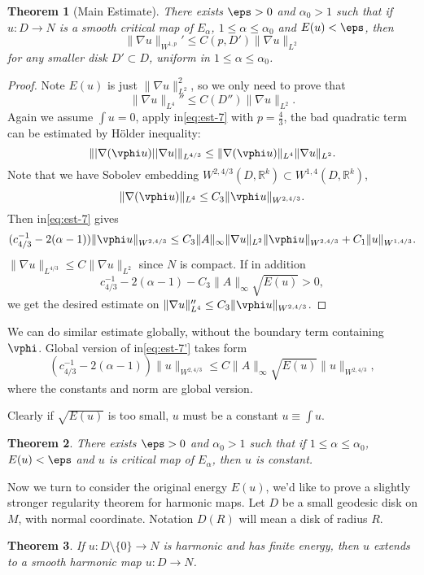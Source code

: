 \documentclass[UTF8,12pt]{article}
\theoremstyle{plain}\newtheorem{theorem}{Theorem}
\theoremstyle{definition}\newtheorem{definition}[theorem]{Definition}
\theoremstyle{definition}\newtheorem{example}[theorem]{Example}
\theoremstyle{plain}\newtheorem{axiom}[theorem]{Axiom}
\theoremstyle{plain}\newtheorem{assertion}[theorem]{Assertion}
\theoremstyle{plain}\newtheorem{corollary}[theorem]{Corollary}
\theoremstyle{plain}\newtheorem{lemma}[theorem]{Lemma}
\theoremstyle{plain}\newtheorem{proposition}[theorem]{Proposition}
\theoremstyle{plain}\newtheorem{prop}[theorem]{Proposition}
\theoremstyle{plain}\newtheorem{conjecture}[theorem]{Conjecture}
\theoremstyle{plain}\newtheorem{conj}[theorem]{Conjecture}
\theoremstyle{plain}\newtheorem{problem}[theorem]{Problem}
\theoremstyle{remark}\newtheorem{notation}[theorem]{Notation}
\theoremstyle{definition}\newtheorem*{question}{Question}
\theoremstyle{definition}\newtheorem*{answer}{Answer}
\theoremstyle{definition}\newtheorem*{goal}{Goal}
\theoremstyle{plain}\newtheorem*{application}{Application}
\theoremstyle{plain}\newtheorem*{exercise}{Exercise}
\theoremstyle{remark}\newtheorem*{remark}{Remark}
\theoremstyle{remark}\newtheorem*{note}{\small{Note}}
\numberwithin{equation}{section}
\numberwithin{theorem}{section}
\numberwithin{figure}{section}
\begin{document}
\begin{theorem}[Main Estimate]\label{thm:main-est}
    There exists \(\eps>0\) and \(\alpha_0>1\) such that if \(u\colon D\to N\)
    is a {\color{red}smooth} critical map of \(E_\alpha\), \(1\le\alpha\le\alpha_0\) and \(E(u)<\eps\), then \[
        \|\nabla u\|_{W^{1,p}}'\le C(p,D')\|\nabla u\|_{L^2}
    \] for any smaller disk \(D'\subset D\), uniform in \(1\le \alpha\le\alpha_0\).
\end{theorem}
\begin{proof}
    Note \(E(u)\) is just \(\|\nabla u\|_{L^2}^2\), so we only need to prove that \[
        \|\nabla u\|_{L^4}''\le C(D'')\|\nabla u\|_{L^2}
    .\] Again we assume \(\int u=0\), apply in\cref{eq:est-7} with \(p=\frac{4}{3}\),
    the bad quadratic term can be estimated by H\"older inequality: \[
        \||\nabla(\vphi u)||\nabla u|\|_{L^{4/3}}
        \le \|\nabla(\vphi u)\|_{L^4}\|\nabla u\|_{L^2}
    .\] Note that we have Sobolev embedding \(W^{2,4/3}(D,\mathbb{R}^k)
    \subset W^{1,4}(D,\mathbb{R}^k)\), \ie\ \[
        \|\nabla(\vphi u)\|_{L^4}\le C_3\|\vphi u\|_{W^{2,4/3}}
    .\] Then in\cref{eq:est-7} gives
    \begin{equation}\label{eq:est-7'}
    (c_{4/3}^{-1}-2(\alpha-1))\|\vphi u\|_{W^{2,4/3}}
    \le C_3\|A\|_{\infty}\|\nabla u\|_{L^2}\|\vphi u\|_{W^{2,4/3}}
    +C_1\|u\|_{W^{1,4/3}}
    .\end{equation}
    \(\|\nabla u\|_{L^{4/3}}\le C\|\nabla u\|_{L^2}\) since \(N\) is
    compact. If in addition \[
        c_{4/3}^{-1}-2(\alpha-1)-C_3\|A\|_{\infty}\sqrt{E(u)}>0
    ,\] we get the desired estimate on \(\|\nabla u\|_{L^4}''\le C_3\|\vphi u\|
    _{W^{2,4/3}}\).
\end{proof}
We can do similar estimate globally, without the boundary term containing \(\vphi\).
Global version of in\cref{eq:est-7'} takes form \[
    (c_{4/3}^{-1}-2(\alpha-1))\|u\|_{W^{2,4/3}}
    \le C\|A\|_{\infty}\sqrt{E(u)}\|u\|_{W^{2,4/3}}
,\] where the constants and norm are global version.

Clearly if \(\sqrt{E(u)}\) is too small, \(u\) must be a constant
\(u\equiv\int u\).
\begin{theorem}\label{thm:energy-gap}
    There exists \(\eps>0\) and \(\alpha_0>1\) such that if \(1\le\alpha\le\alpha_0\),
    \(E(u)<\eps\) and \(u\) is critical map of \(E_\alpha\), then \(u\) is constant.
\end{theorem}

Now we turn to consider the original energy \(E(u)\), we'd like to prove a slightly
stronger regularity theorem for harmonic maps. Let \(D\) be a small geodesic disk
on \(M\), with normal coordinate. Notation \(D(R)\) will mean a disk of radius \(R\).
\begin{theorem}\label{thm:removable-singularity}
    If \(u\colon D\setminus\{0\}\to N\) is harmonic and has finite energy, then
    \(u\) extends to a smooth harmonic map \(u\colon D\to N\).
\end{theorem}
\end{document}
